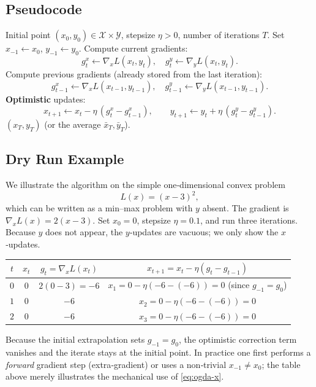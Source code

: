 \documentclass{article}
\begin{document}
\subsection*{Pseudocode}
\begin{algorithm}[H]
\caption{Optimistic Gradient Descent–Ascent (OGDA)}\label{alg:ogda}
\begin{algorithmic}[1]
\REQUIRE Initial point $(x_0,y_0)\in\mathcal{X}\times\mathcal{Y}$, stepsize $\eta>0$, number of iterations $T$.
\STATE Set $x_{-1}\gets x_0$, $y_{-1}\gets y_0$.
    \STATE Compute current gradients:
    \[
    g^x_t\gets \nabla_x L(x_t,y_t),\quad 
    g^y_t\gets \nabla_y L(x_t,y_t).
    \]
    \STATE Compute previous gradients (already stored from the last iteration):
    \[
    g^x_{t-1}\gets \nabla_x L(x_{t-1},y_{t-1}),\quad 
    g^y_{t-1}\gets \nabla_y L(x_{t-1},y_{t-1}).
    \]
    \STATE \textbf{Optimistic} updates:
    \[
    x_{t+1}\gets x_t-\eta\,(g^x_t-g^x_{t-1}),\qquad
    y_{t+1}\gets y_t+\eta\,(g^y_t-g^y_{t-1}).
    \]
\ENDFOR
\RETURN $(x_T,y_T)$ (or the average $\bar x_T,\bar y_T$).
\end{algorithmic}
\end{algorithm}

\subsection*{Dry Run Example}
We illustrate the algorithm on the simple one‑dimensional convex problem
\[
L(x)= (x-3)^2,
\]
which can be written as a min–max problem with $y$ absent.  The gradient is $ \nabla_x L(x)=2(x-3)$.  
Set $x_0=0$, stepsize $\eta=0.1$, and run three iterations.  
Because $y$ does not appear, the $y$‑updates are vacuous; we only show the $x$‑updates.

\begin{center}
\begin{tabular}{c|c|c|c}
$t$ & $x_t$ & $g_t=\nabla_x L(x_t)$ & $x_{t+1}=x_t-\eta(g_t-g_{t-1})$\\ \hline
$0$ & $0$ & $2(0-3)=-6$ & $x_{1}=0-\eta(-6-(-6))=0$ (since $g_{-1}=g_0$)\\
$1$ & $0$ & $-6$ & $x_{2}=0-\eta(-6-(-6))=0$\\
$2$ & $0$ & $-6$ & $x_{3}=0-\eta(-6-(-6))=0$
\end{tabular}
\end{center}
Because the initial extrapolation sets $g_{-1}=g_0$, the optimistic correction term vanishes and the iterate stays at the initial point.  In practice one first performs a \emph{forward} gradient step (extra‑gradient) or uses a non‑trivial $x_{-1}\neq x_0$; the table above merely illustrates the mechanical use of \eqref{eq:ogda-x}.
\end{document}
